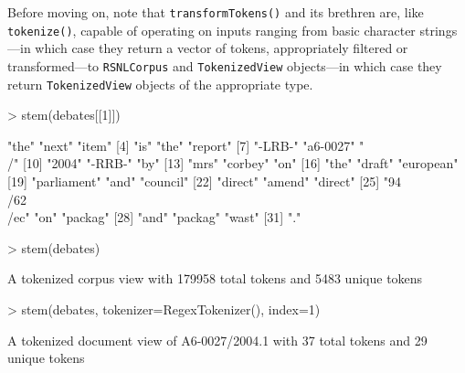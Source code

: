 \documentclass[11pt]{article}
\let\code=\texttt
\let\rclass=\texttt
\begin{document}
Before moving on, note that \code{transformTokens()} and its brethren
are, like \code{tokenize()}, capable of operating on inputs ranging
from basic character strings---in which case they return  a vector of
tokens, appropriately filtered or transformed---to \rclass{RSNLCorpus}
and \rclass{TokenizedView} objects---in which case they return
\rclass{TokenizedView} objects of the appropriate type.
\begin{Schunk}
\begin{Sinput}
> stem(debates[[1]])
\end{Sinput}
\begin{Soutput}
 [1] "the"          "next"         "item"        
 [4] "is"           "the"          "report"      
 [7] "-LRB-"        "a6-0027"      "\\/"         
[10] "2004"         "-RRB-"        "by"          
[13] "mrs"          "corbey"       "on"          
[16] "the"          "draft"        "european"    
[19] "parliament"   "and"          "council"     
[22] "direct"       "amend"        "direct"      
[25] "94\\/62\\/ec" "on"           "packag"      
[28] "and"          "packag"       "wast"        
[31] "."           
\end{Soutput}
\begin{Sinput}
> stem(debates)
\end{Sinput}
\begin{Soutput}
A tokenized corpus view with 179958 total tokens and 5483 unique tokens
\end{Soutput}
\begin{Sinput}
> stem(debates, tokenizer=RegexTokenizer(), index=1)
\end{Sinput}
\begin{Soutput}
A tokenized document view of A6-0027/2004.1 with 37 total tokens and 29 unique tokens
\end{Soutput}
\end{Schunk}
\end{document}
